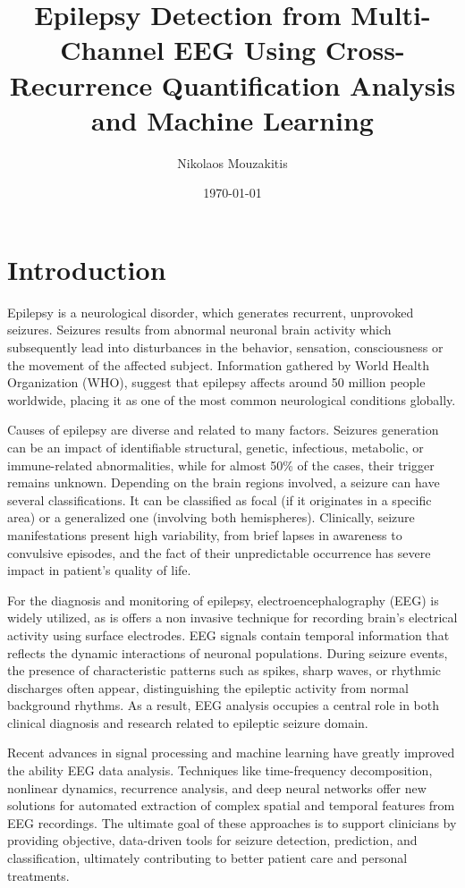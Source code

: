 \documentclass{article}
\title{Epilepsy Detection from Multi-Channel EEG Using Cross-Recurrence Quantification Analysis and Machine Learning}
\author{Nikolaos Mouzakitis} %
\date{\today} %
\begin{document}
	\maketitle

	\section*{Introduction}
	Epilepsy is a neurological disorder, 
	which generates recurrent, unprovoked seizures. 
	Seizures results from abnormal neuronal brain activity which subsequently lead into 
	disturbances in the behavior, sensation, consciousness or the movement of the affected subject.
	Information gathered by  World Health Organization (WHO), suggest that epilepsy affects 
	around 50 million people worldwide, placing it as one of the most common 
	neurological conditions globally.

	Causes of epilepsy are diverse and related to many factors. 
	Seizures generation can be an impact of identifiable structural, 
	genetic, infectious, metabolic, or immune-related abnormalities, 
	while for almost 50\% of the cases, their trigger remains unknown\cite{causes}. 
	Depending on the brain regions involved, a seizure can have several classifications. 
	It can be classified as focal (if it originates in a specific area) 
	or a generalized one (involving both hemispheres). 
	Clinically, seizure manifestations present high variability, 
	from brief lapses in awareness to 
	convulsive episodes, and the fact of their unpredictable occurrence 
	has severe impact in patient’s quality of life.

	For the diagnosis and monitoring of epilepsy, electroencephalography (EEG) 
	is widely utilized, as is offers a non invasive 
	technique for recording brain’s electrical activity using surface electrodes. 
	EEG signals contain temporal information that reflects 
	the dynamic interactions 
	of neuronal populations. 
	During seizure events, the presence of characteristic patterns 
	such as spikes, sharp waves, or rhythmic discharges often appear, 
	distinguishing the epileptic activity from normal background rhythms. 
	As a result, EEG analysis occupies a central role in both clinical diagnosis 
	and research related to epileptic seizure domain.

	Recent advances in signal processing and machine learning have greatly 
	improved the ability EEG data analysis. 
	Techniques like time-frequency decomposition, 
	nonlinear dynamics, recurrence analysis, and deep neural networks 
	offer new solutions for automated extraction of complex spatial and temporal 
	features from EEG recordings. The ultimate goal of these approaches is
	to support clinicians by providing objective, data-driven tools for 
	seizure detection, prediction, and classification, ultimately contributing to 
	better patient care and personal treatments.
\end{document}
